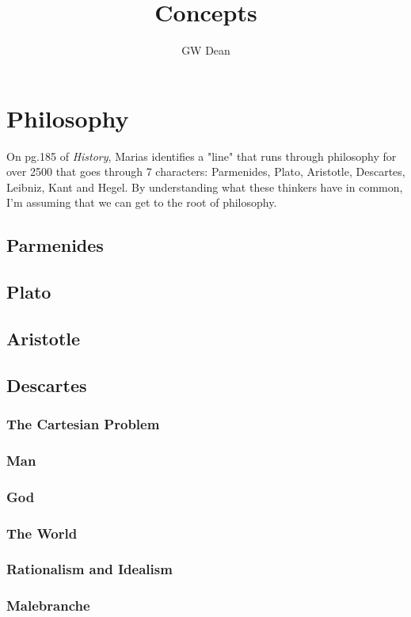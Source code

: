 \documentclass[a4paper,11pt]{article}
\author{GW Dean}
\title{Concepts}
\begin{document}
\maketitle
\tableofcontents
\section{Philosophy}

On pg.185 of \emph{History}, Marias identifies a "line" that runs through
philosophy for over 2500 that goes through 7 characters: Parmenides, Plato,
Aristotle, Descartes, Leibniz, Kant and Hegel. By understanding what these
thinkers have in common, I'm assuming that we can get to the root of philosophy.


\subsection{Parmenides}
\subsection{Plato}
\subsection{Aristotle}
\subsection{Descartes}
\subsubsection{The Cartesian Problem}
\subsubsection{Man}
\subsubsection{God}
\subsubsection{The World}
\subsubsection{Rationalism and Idealism}
\subsubsection{Malebranche}
\end{document}

